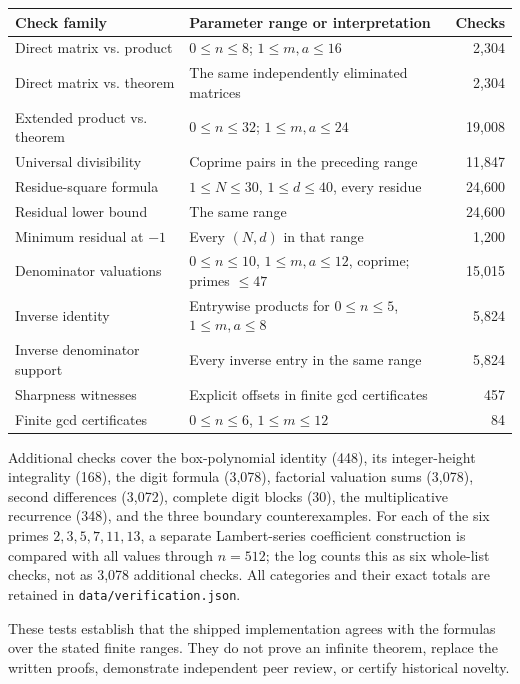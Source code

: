 \documentclass[11pt,a4paper]{article}
\numberwithin{equation}{section}
\theoremstyle{definition}
\theoremstyle{remark}
\begin{document}
\begin{center}
\small
\begin{tabular}{@{}p{}p{}r@{}}
\toprule
Check family & Parameter range or interpretation & Checks\\
\midrule
Direct matrix vs. product & $0\leq n\leq8$; $1\leq m,a\leq16$ & 2,304\\
Direct matrix vs. theorem & The same independently eliminated matrices & 2,304\\
Extended product vs. theorem & $0\leq n\leq32$; $1\leq m,a\leq24$ & 19,008\\
Universal divisibility & Coprime pairs in the preceding range & 11,847\\
Residue-square formula & $1\leq N\leq30$, $1\leq d\leq40$, every residue & 24,600\\
Residual lower bound & The same range & 24,600\\
Minimum residual at $-1$ & Every $(N,d)$ in that range & 1,200\\
Denominator valuations & $0\leq n\leq10$, $1\leq m,a\leq12$, coprime; primes $\leq47$ & 15,015\\
Inverse identity & Entrywise products for $0\leq n\leq5$, $1\leq m,a\leq8$ & 5,824\\
Inverse denominator support & Every inverse entry in the same range & 5,824\\
Sharpness witnesses & Explicit offsets in finite gcd certificates & 457\\
Finite gcd certificates & $0\leq n\leq6$, $1\leq m\leq12$ & 84\\
\bottomrule
\end{tabular}
\end{center}

Additional checks cover the box-polynomial identity (448), its integer-height integrality (168), the digit formula (3,078), factorial valuation sums (3,078), second differences (3,072), complete digit blocks (30), the multiplicative recurrence (348), and the three boundary counterexamples. For each of the six primes $2,3,5,7,11,13$, a separate Lambert-series coefficient construction is compared with all values through $n=512$; the log counts this as six whole-list checks, not as 3,078 additional checks. All categories and their exact totals are retained in \texttt{data/verification.json}.

These tests establish that the shipped implementation agrees with the formulas over the stated finite ranges. They do not prove an infinite theorem, replace the written proofs, demonstrate independent peer review, or certify historical novelty.
\end{document}
